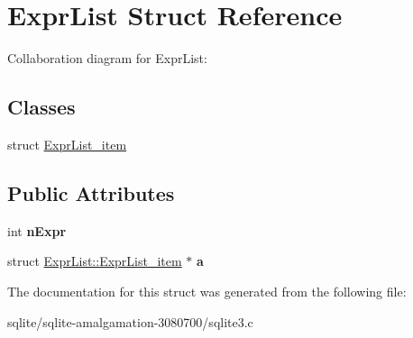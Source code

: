 \hypertarget{struct_expr_list}{\section{Expr\+List Struct Reference}
\label{struct_expr_list}
}


Collaboration diagram for Expr\+List\+:
\subsection*{Classes}
\begin{DoxyCompactItemize}
\item 
struct \hyperlink{struct_expr_list_1_1_expr_list__item}{Expr\+List\+\_\+item}
\end{DoxyCompactItemize}
\subsection*{Public Attributes}
\begin{DoxyCompactItemize}
\item 
\hypertarget{struct_expr_list_a88bdbd62cce306124eea63ae9f80ec33}{int {\bfseries n\+Expr}}\label{struct_expr_list_a88bdbd62cce306124eea63ae9f80ec33}

\item 
\hypertarget{struct_expr_list_a02a4222d2dc4da64dcec416188abc16c}{struct \hyperlink{struct_expr_list_1_1_expr_list__item}{Expr\+List\+::\+Expr\+List\+\_\+item} $\ast$ {\bfseries a}}\label{struct_expr_list_a02a4222d2dc4da64dcec416188abc16c}

\end{DoxyCompactItemize}


The documentation for this struct was generated from the following file\+:\begin{DoxyCompactItemize}
\item 
sqlite/sqlite-\/amalgamation-\/3080700/sqlite3.\+c\end{DoxyCompactItemize}
